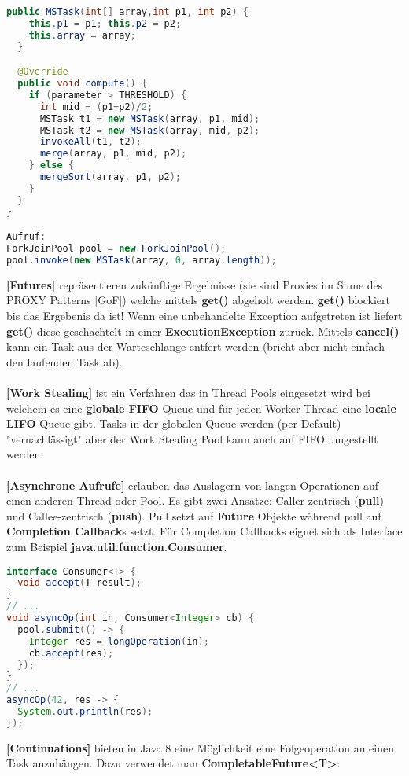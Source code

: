 \documentclass[8pt]{extarticle}
\let\oldtextbf\textbf
\renewcommand{\textbf}{\tiny\oldtextbf}
\begin{document}
\begin{multicols*}{5}
\begin{lstlisting}[language=java]
  public MSTask(int[] array,int p1, int p2) {
    this.p1 = p1; this.p2 = p2;
    this.array = array;
  }

  @Override
  public void compute() {
    if (parameter > THRESHOLD) {
      int mid = (p1+p2)/2;
      MSTask t1 = new MSTask(array, p1, mid);
      MSTask t2 = new MSTask(array, mid, p2);
      invokeAll(t1, t2);
      merge(array, p1, mid, p2);
    } else {
      mergeSort(array, p1, p2);
    }
  }
}

Aufruf:
ForkJoinPool pool = new ForkJoinPool();
pool.invoke(new MSTask(array, 0, array.length));
\end{lstlisting}
\textbf{[Futures]} repräsentieren zukünftige Ergebnisse (sie sind Proxies im Sinne des PROXY Patterns [GoF]) welche mittels \textbf{get()} abgeholt werden. \textbf{get()} blockiert bis das Ergebenis da ist! Wenn eine unbehandelte Exception aufgetreten ist liefert \textbf{get()} diese geschachtelt in einer \textbf{ExecutionException} zurück. Mittels \textbf{cancel()} kann ein Task aus der Warteschlange entfert werden (bricht aber nicht einfach den laufenden Task ab).\\\\
\textbf{[Work Stealing]} ist ein Verfahren das in Thread Pools eingesetzt wird bei welchem es eine \textbf{globale FIFO} Queue und für jeden Worker Thread eine \textbf{locale LIFO} Queue gibt. Tasks in der globalen Queue werden (per Default) "vernachlässigt" aber der Work Stealing Pool kann auch auf FIFO umgestellt werden.\\\\
\textbf{[Asynchrone Aufrufe]} erlauben das Auslagern von langen Operationen auf einen anderen Thread oder Pool. Es gibt zwei Ansätze: Caller-zentrisch (\textbf{pull}) und Callee-zentrisch (\textbf{push}). Pull setzt auf \textbf{Future} Objekte während pull auf \textbf{Completion Callback}s setzt. Für Completion Callbacks eignet sich als Interface zum Beispiel \textbf{java.util.function.Consumer}.
\begin{lstlisting}[language=java]
interface Consumer<T> {
  void accept(T result);
}
// ...
void asyncOp(int in, Consumer<Integer> cb) {
  pool.submit(() -> {
    Integer res = longOperation(in);
    cb.accept(res);
  });
}
// ...
asyncOp(42, res -> {
  System.out.println(res);
});
\end{lstlisting}
\textbf{[Continuations]} bieten in Java 8 eine Möglichkeit eine Folgeoperation an einen Task anzuhängen. Dazu verwendet man \textbf{CompletableFuture<T>}:
\begin{lstlisting}[language=java]

\end{lstlisting}
\end{multicols*}
\end{document}
